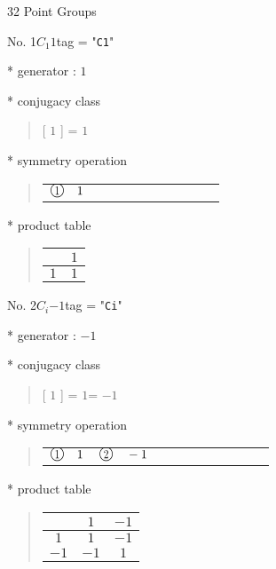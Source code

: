 \documentclass[fleqn,10pt,landscape]{jsarticle}
\begin{document}
\setcounter{MaxMatrixCols}{16}

\begin{center}
\LARGE
32 Point Groups
\end{center}

No. 1\quad$C_{1}$\quad$1$\quad[ triclinic ]
tag = "{\tt C1}"

* generator : $1$

* conjugacy class
\begin{quote}
[ $1$ ] = \quad $1$\newline
\end{quote}

* symmetry operation
\begin{quote}
\begin{tabular}{llllllllll}
$ {\ooalign{\hfil\resizebox{.8\width}{\height}{1}\hfil\crcr\raise.1ex\hbox{\large$\bigcirc$}}}\quad 1 $
\end{tabular}
\end{quote}

* product table
\begin{quote}
\begin{tabular}{cc} \hline \hline
 & $ 1 $ \\ \hline
$ 1 $ & $ 1 $ \\
 \hline \hline
\end{tabular}
\end{quote}

\newpage

No. 2\quad$C_{i}$\quad$-1$\quad[ triclinic ]
tag = "{\tt Ci}"

* generator : $-1$

* conjugacy class
\begin{quote}
[ $1$ ] = \quad $1$\newline[ $-1$ ] = \quad $-1$\newline
\end{quote}

* symmetry operation
\begin{quote}
\begin{tabular}{llllllllll}
$ {\ooalign{\hfil\resizebox{.8\width}{\height}{1}\hfil\crcr\raise.1ex\hbox{\large$\bigcirc$}}}\quad 1 $ & $ {\ooalign{\hfil\resizebox{.8\width}{\height}{2}\hfil\crcr\raise.1ex\hbox{\large$\bigcirc$}}}\quad -1 $
\end{tabular}
\end{quote}

* product table
\begin{quote}
\begin{tabular}{ccc} \hline \hline
 & $ 1 $ & $ -1 $ \\ \hline
$ 1 $ & $ 1 $ & $ -1 $ \\
$ -1 $ & $ -1 $ & $ 1 $ \\
 \hline \hline
\end{tabular}
\end{quote}
\end{document}
